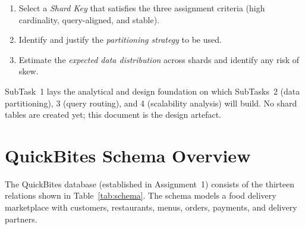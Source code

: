\documentclass[12pt, a4paper]{article}
\renewcommand{\_}{\plainunderscore\allowbreak}
\begin{document}
\begin{enumerate}[leftmargin=*, label=\arabic*.]
  \item Select a \emph{Shard Key} that satisfies the three assignment criteria
        (high cardinality, query-aligned, and stable).
  \item Identify and justify the \emph{partitioning strategy} to be used.
  \item Estimate the \emph{expected data distribution} across shards and
        identify any risk of skew.
\end{enumerate}

SubTask~1 lays the analytical and design foundation on which SubTasks~2
(data partitioning), 3 (query routing), and 4 (scalability analysis) will
build. No shard tables are created yet; this document is the design artefact.

\section{QuickBites Schema Overview}

The QuickBites database (established in Assignment~1) consists of the thirteen
relations shown in Table~\ref{tab:schema}. The schema models a food delivery
marketplace with customers, restaurants, menus, orders, payments, and
delivery partners.
\end{document}
